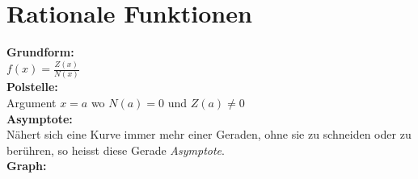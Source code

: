 \documentclass[11pt,twocolumn,a4paper]{article}
\begin{document}
\section{Rationale Funktionen}
\textbf{Grundform:}\\ \(f(x) =
\frac{Z(x)}{N(x)}\)\\ \textbf{Polstelle:}\\ Argument \(x=a\) wo \(N(a)
= 0\) und \(Z(a) \ne 0\)\\ \textbf{Asymptote:}\\ Nähert sich eine Kurve immer
mehr einer Geraden, ohne sie zu schneiden oder zu berühren, so heisst diese
Gerade \textit{Asymptote}.\\
\textbf{Graph:}\\
\end{document}
